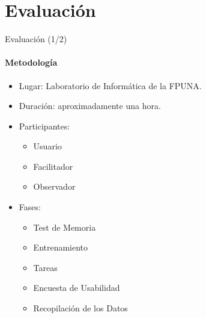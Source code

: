 \section{Evaluaci\'on}

\begin{frame}{Evaluaci\'on (1/2)}
\framesubtitle{Metodolog\'ia}


\begin{itemize}
    \vfill \item<+->{ Lugar: Laboratorio de Inform\'atica de la FPUNA.}
    \vfill \item<+->{ Duraci\'on: aproximadamente una hora. } 
    \vfill \item<+->{ Participantes:}
        \begin{itemize}
            \vfill \item<+->{ Usuario }
            \vfill \item<+->{ Facilitador }
            \vfill \item<+->{ Observador }
        \end{itemize}
    \vfill \item<+->{ Fases: }
        \begin{itemize}
            \vfill \item<+->{ Test de Memoria }
            \vfill \item<+->{ Entrenamiento }
            \vfill \item<+->{ Tareas }
            \vfill \item<+->{ Encuesta de Usabilidad }
            \vfill \item<+->{ Recopilaci\'on de los Datos }
        \end{itemize}   
\end{itemize}
\end{frame}


